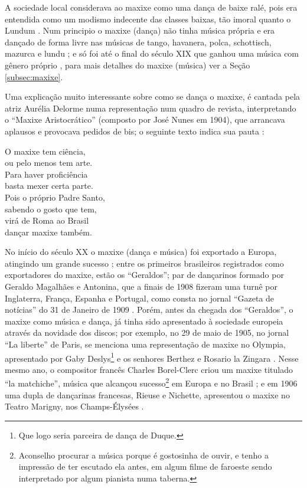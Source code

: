 A sociedade local considerava ao maxixe como uma dança de baixe ralé, 
pois era entendida como um modismo indecente das classes baixas, tão imoral quanto o Lundum \cite[pp. 198]{dourado2004dicionario}.
Num principio o maxixe (dança) não tinha música própria e era dançado de forma livre nas músicas de 
tango, havanera, polca, schottisch, mazurca e lundu 
\cite[pp. 465]{marcondes1977enciclopedia} \cite[pp. 58]{tinhorao1986pequena}  
\cite[pp. 198]{dourado2004dicionario} \cite[pp. 62]{reinato2010musica}; 
e só foi até o final do século XIX que ganhou uma música com gênero próprio \cite[pp. 465]{marcondes1977enciclopedia},
para mais detalhes do maxixe (música) ver a Seção \ref{subsec:maxixe}.

Uma explicação muito interessante sobre como se dança o maxixe, 
é cantada pela atriz Aurélia Delorme numa representação num quadro de revista, 
interpretando o ``Maxixe Aristocrático'' (composto por José Nunes em 1904), 
que arrancava aplausos e provocava pedidos de bis;
o seguinte texto indica sua pauta \cite[pp. 80-81]{efege1974maxixe} \cite{REIS2003}: 
\begin{citando}
O maxixe tem ciência,\\
ou pelo menos tem arte.\\
Para haver proficiência\\
basta mexer certa parte.\\
Pois o próprio Padre Santo,\\
sabendo o gosto que tem,\\
virá de Roma ao Brasil\\
dançar maxixe também.\\ 
\end{citando}


No início do século XX o maxixe (dança e música) foi exportado a Europa, atingindo um grande sucesso
\cite[pp. 465]{marcondes1977enciclopedia};
entre os primeiros brasileiros registrados como exportadores do maxixe, estão 
os ``Geraldos''; par de dançarinos formado por Geraldo Magalhães e Antonina,
 que a finais de 1908 fizeram uma turnê por Inglaterra, França, Espanha e Portugal,
como consta no jornal ``Gazeta de notícias'' do 31 de Janeiro de 1909 
\cite[pp. 3]{maxixegeraldos} \cite[pp. 79, 93]{tinhorao1986pequena}.
Porém, antes da chegada dos ``Geraldos'', o maxixe como música e dança, já tinha sido
apresentado à sociedade europeia através da novidade dos discos; por exemplo,
no 29 de maio de 1905, no jornal ``La liberte'' de Paris, se menciona uma representação de maxixe no Olympia,
apresentado por Gaby Deslys\footnote{Que logo seria parceira de dança de Duque.} e 
os senhores Berthez e Rosario la Zingara \cite[pp. 3]{maxixe1905}.
Nesse mesmo ano, o compositor francês Charles Borel-Clerc criou um maxixe titulado ``la matchiche'',
música que alcançou sucesso\footnote{Aconselho procurar a música porque é gostosinha de ouvir, 
e tenho a impressão de ter escutado ela antes, em algum filme de faroeste sendo interpretado por algum pianista numa taberna.} 
em Europa e no Brasil \cite[pp. 79]{tinhorao1986pequena} \cite[pp. 175]{delfino1998brasil} \cite[pp. 180]{dourado2004dicionario};
e em 1906 uma dupla de dançarinas francesas, Rieuse e Nichette, 
apresentou o maxixe no Teatro Marigny, nos Champs-Élysées \cite[pp. 79-80]{tinhorao1986pequena}.

